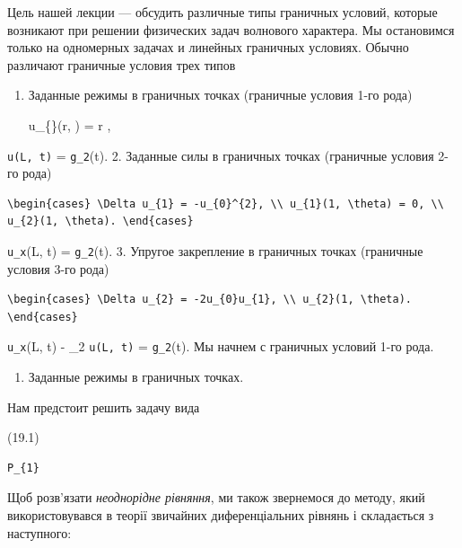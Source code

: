 \documentclass[
  ukrainian,
]{article}
\providecommand{\tightlist}{%
  \setlength{\itemsep}{0pt}\setlength{\parskip}{0pt}}
\begin{document}
Цель нашей лекции --- обсудить различные типы граничных условий, которые
возникают при решении физических задач волнового характера. Мы
остановимся только на одномерных задачах и линейных граничных условиях.
Обычно различают граничные условия трех типов

\begin{enumerate}
\def\labelenumi{\arabic{enumi}.}
\item
  Заданные режимы в граничных точках (граничные условия 1-го рода)

  \qquad u\_\{\theta\}(r, \theta) = r \cos \theta,
\end{enumerate}

\texttt{u(L,\ t)} = \texttt{g\_2}(t). 2. Заданные силы в граничных
точках (граничные условия 2-го рода)

\begin{verbatim}
\begin{cases} \Delta u_{1} = -u_{0}^{2}, \\ u_{1}(1, \theta) = 0, \\ u_{2}(1, \theta). \end{cases}
\end{verbatim}

\texttt{u\_x}(L, t) = \texttt{g\_2}(t). 3. Упругое закрепление в
граничных точках (граничные условия 3-го рода)

\begin{verbatim}
\begin{cases} \Delta u_{2} = -2u_{0}u_{1}, \\ u_{2}(1, \theta). \end{cases}
\end{verbatim}

\texttt{u\_x}(L, t) - \gamma\_2 \texttt{u(L,\ t)} = \texttt{g\_2}(t). Мы
начнем с граничных условий 1-го рода.

\begin{enumerate}
\def\labelenumi{\arabic{enumi}.}
\tightlist
\item
  Заданные режимы в граничных точках.
\end{enumerate}

Нам предстоит решить задачу вида

(19.1)

\begin{verbatim}
P_{1}
\end{verbatim}

Щоб розв'язати \emph{неоднорідне рівняння}, ми також звернемося до
методу, який використовувався в теорії звичайних диференціальних рівнянь
і складається з наступного:
\end{document}
